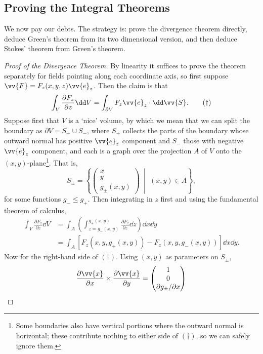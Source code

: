 \subsection{Proving the Integral Theorems}
\label{subsec:proofs}

We now pay our debts. The strategy is: prove the divergence theorem directly, deduce Green's theorem from its two dimensional version, and then deduce Stokes' theorem from Green's theorem.

\begin{proof}[Proof of the Divergence Theorem]
	By linearity it suffices to prove the theorem separately for fields pointing along each coordinate axis, so first suppose $\vv{F} = F_z(x, y, z) \vv{e}_z$. Then the claim is that
	\begin{equation}
	\int_V \frac{\partial F_z}{\partial z} \dd V = \int_{\partial V} F_z \vv{e}_z \cdot \dd \vv{S}. \tag{$\dagger$}
	\end{equation}
	Suppose first that $V$ is a `nice' volume, by which we mean that we can split the boundary as $\partial V = S_+ \cup S_-$, where $S_+$ collects the parts of the boundary whose outward normal has positive $\vv{e}_z$ component and $S_-$ those with negative $\vv{e}_z$ component, and each is a graph over the projection $A$ of $V$ onto the $(x, y)$-plane\footnote{Some boundaries also have vertical portions where the outward normal is horizontal; these contribute nothing to either side of $(\dagger)$, so we can safely ignore them.}. That is,
	$$
	S_{\pm} = \left\{\begin{pmatrix}
		x \\ y \\ g_{\pm}(x, y)
	\end{pmatrix} \;\middle|\; (x, y) \in A \right\},
	$$
	for some functions $g_- \leq g_+$. Then integrating in $z$ first and using the fundamental theorem of calculus,
	\begin{align*}
		\int_V \frac{\partial F_z}{\partial z} \dd V &= \int_A \left(\int_{z = g_-(x,y)}^{g_+(x, y)} \frac{\partial F_z}{\partial z} \dd z \right) \dd x \dd y \\
		&= \int_A \left[F_z(x, y, g_+(x, y)) - F_z(x, y, g_-(x, y))\right] \dd x \dd y.
	\end{align*}
	Now for the right-hand side of $(\dagger)$. Using $(x, y)$ as parameters on $S_\pm$,
	$$
	\frac{\partial \vv{x}}{\partial x} \times \frac{\partial \vv{x}}{\partial y} = \begin{pmatrix}
		1 \\ 0 \\ \partial g_\pm/\partial x

\end{pmatrix}$$
\end{proof}
